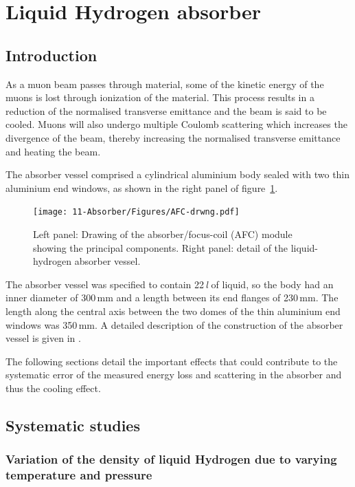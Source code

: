 
\graphicspath{{11-Absorber/Figures/}}

\section{Liquid Hydrogen absorber}
\label{Sect:Absorber}

\subsection{Introduction}
As a muon beam passes through material, some of the kinetic energy
of the muons is lost through ionization of the material.
This process results in a reduction of the normalised
transverse emittance and the beam is said to be cooled.
Muons will also undergo multiple Coulomb scattering which
increases the divergence of the beam, thereby
increasing the normalised transverse emittance and heating the beam.

The absorber vessel comprised a cylindrical aluminium body sealed with
two thin aluminium end windows, as shown in the right panel of
figure~\ref{Fig:AbsorberVessel:Diag}.
\begin{figure}[htb!]
  \begin{center}
    \texttt{[image: 11-Absorber/Figures/AFC-drwng.pdf]}
  \end{center}
  \caption{
    Left panel: Drawing of the absorber/focus-coil (AFC) module showing the principal components. Right panel: detail of the liquid-hydrogen absorber vessel.
  }
  \label{Fig:AbsorberVessel:Diag}
\end{figure}
The absorber vessel was specified to contain 22\,\textit{l} of liquid, so
the body had an inner diameter of 300\,mm and a length between its end
flanges of 230\,mm.  
The length along the central axis between the two domes of the thin aluminium end
windows was 350\,mm.
A detailed description of the construction of the absorber vessel is given in \cite{1748-0221-13-09-T09008}.

The following sections detail the important effects that could contribute to the systematic error of the measured energy loss and scattering in the absorber and thus the cooling effect.

\subsection{Systematic studies}

\subsubsection{Variation of the density of liquid Hydrogen due to varying temperature and pressure}
\label{SubSect:Absorber_temperature}

